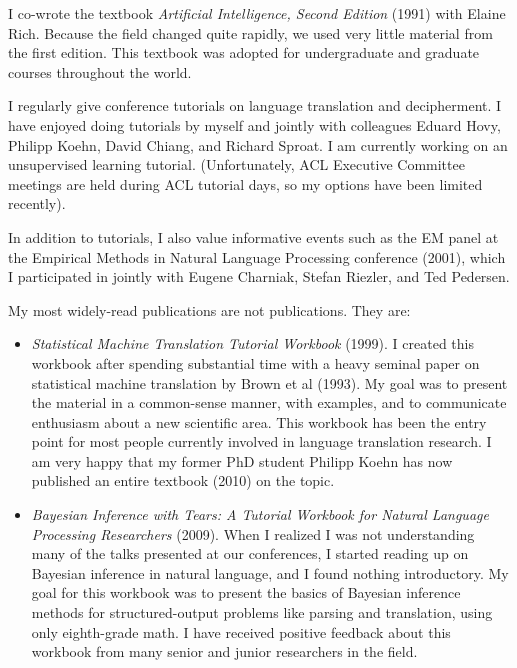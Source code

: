 I co-wrote the textbook {\em Artificial Intelligence, Second Edition} 
(1991) with Elaine Rich.  Because the field changed quite rapidly, 
we used very little material from the first edition.  This textbook 
was adopted for undergraduate and graduate courses throughout the world.


\noindent
I regularly give conference tutorials on language translation and 
decipherment.  I have enjoyed doing 
tutorials by myself and jointly with colleagues Eduard Hovy, Philipp 
Koehn, David Chiang, and Richard Sproat.  I am currently working on 
an unsupervised learning tutorial.  (Unfortunately, ACL Executive Committee
meetings are held during ACL tutorial days, so my options have been
limited recently).

In addition to tutorials, I also value informative 
events such as the EM panel at the Empirical Methods in Natural 
Language Processing conference (2001), which I participated in 
jointly with Eugene Charniak, Stefan Riezler, and Ted Pedersen.


\noindent
My most widely-read publications are not publications.  They are:

\begin{itemize}

\item {\em Statistical Machine Translation Tutorial Workbook} (1999). 
I created this workbook after spending substantial time with a
heavy seminal paper on statistical machine translation by Brown et
al (1993).  My goal 
was to present the material in a common-sense manner, with examples, 
and to communicate enthusiasm about a new scientific area.  This 
workbook has been the entry point for most people currently 
involved in language translation research.
I am very happy that my former PhD student Philipp Koehn has 
now published an entire textbook (2010) on the topic.

\item {\em Bayesian Inference with Tears:  A Tutorial Workbook for 
Natural Language Processing Researchers} (2009).  When I realized I was 
not understanding many of the talks presented at our conferences, I 
started reading up on Bayesian inference in natural language, and I found 
nothing introductory.
My goal for this workbook was to present the basics of 
Bayesian inference methods for structured-output problems like 
parsing and translation, using only eighth-grade math.  
I have received positive feedback about this workbook from many 
senior and junior researchers in the field.

\end{itemize}

